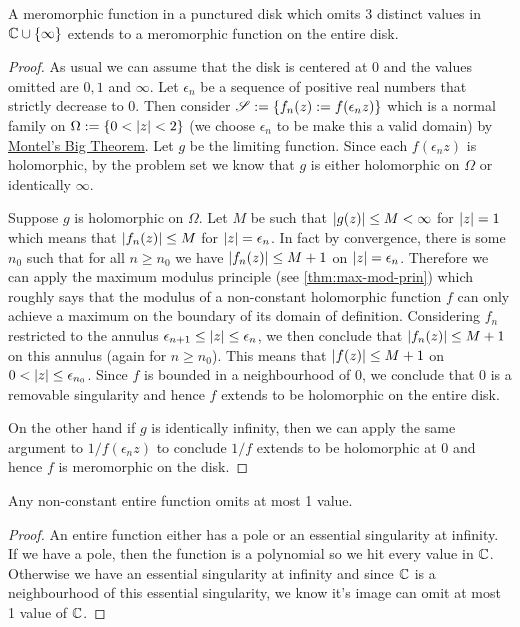 \begin{theorem}
    A meromorphic function in a punctured disk which omits 3 distinct values in $\mathbb{C} \cup \{\infty\}$ extends to a meromorphic function on the entire disk.
\end{theorem}
\begin{proof}
    As usual we can assume that the disk is centered at 0 and the values omitted are $0, 1$ and $\infty$. Let $\epsilon_n$ be a sequence of positive real numbers that strictly decrease to 0. Then consider $\mathscr{S} := \{f_n(z) := f(\epsilon_n z)\}$ which is a normal family on $\Omega := \{0 < \left|z\right| < 2\}$ (we choose $\epsilon_n$ to be make this a valid domain) by \hyperref[thm:montel-big-thm]{Montel's Big Theorem}. Let $g$ be the limiting function. Since each $f(\epsilon_n z)$ is holomorphic, by the problem set we know that $g$ is either holomorphic on $\Omega$ or identically $\infty$. 
    
    Suppose $g$ is holomorphic on $\Omega$. Let $M$ be such that $\left|g(z)\right| \leq M < \infty$ for $\left|z\right| = 1$ which means that $\left|f_n(z)\right| \leq M$ for $\left|z\right| = \epsilon_n$. In fact by convergence, there is some $n_0$ such that for all $n \geq n_0$ we have $\left|f_n(z)\right| \leq M + 1$ on $\left|z\right| = \epsilon_n$. Therefore we can apply the maximum modulus principle (see \autoref{thm:max-mod-prin}) which roughly says that the modulus of a non-constant holomorphic function $f$ can only achieve a maximum on the boundary of its domain of definition. Considering $f_n$ restricted to the annulus $\epsilon_{n + 1} \leq \left|z\right| \leq \epsilon_n$, we then conclude that $\left|f_n(z)\right| \leq M + 1$ on this annulus (again for $n \geq n_0$). This means that $\left|f(z)\right| \leq M + 1$ on $0 < \left|z\right| \leq \epsilon_{n_0}$. Since $f$ is bounded in a neighbourhood of 0, we conclude that 0 is a removable singularity and hence $f$ extends to be holomorphic on the entire disk.
    
    On the other hand if $g$ is identically infinity, then we can apply the same argument to $1/f(\epsilon_n z)$ to conclude $1/f$ extends to be holomorphic at 0 and hence $f$ is meromorphic on the disk.
\end{proof}

\begin{theorem}
    Any non-constant entire function omits at most 1 value.
\end{theorem}
\begin{proof}
    An entire function either has a pole or an essential singularity at infinity. If we have a pole, then the function is a polynomial so we hit every value in $\mathbb{C}$. Otherwise we have an essential singularity at infinity and since $\mathbb{C}$ is a neighbourhood of this essential singularity, we know it's image can omit at most 1 value of $\mathbb{C}$.
\end{proof}

